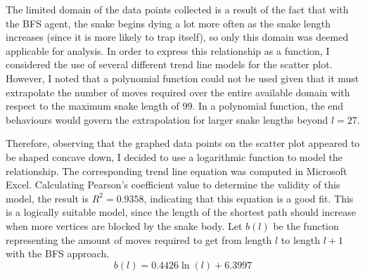 \documentclass[12pt]{article}
\begin{document}
The limited domain of the data points collected is a result of the fact that with the BFS agent, the snake begins dying a lot more often as the snake length increases (since it is more likely to trap itself), so only this domain was deemed applicable for analysis. In order to express this relationship as a function, I considered the use of several different trend line models for the scatter plot. However, I noted that a polynomial function could not be used given that it must extrapolate the number of moves required over the entire available domain with respect to the maximum snake length of 99. In a polynomial function, the end behaviours would govern the extrapolation for larger snake lengths beyond $l=27$.

\begin{figure}[!h]
\centering
	\caption{}
	\label{fig:bfs_sim_data}
\end{figure}

Therefore, observing that the graphed data points on the scatter plot appeared to be shaped concave down, I decided to use a logarithmic function to model the relationship. The corresponding trend line equation was computed in Microsoft Excel. Calculating Pearson's coefficient value to determine the validity of this model, the result is $R^2 = 0.9358$, indicating that this equation is a good fit. This is a logically suitable model, since the length of the shortest path should increase when more vertices are blocked by the snake body. Let $b(l)$ be the function representing the amount of moves required to get from length $l$ to length $l+1$ with the BFS approach.
\begin{equation}
b(l) = 0.4426\ln(l) + 6.3997
\end{equation}
\end{document}

